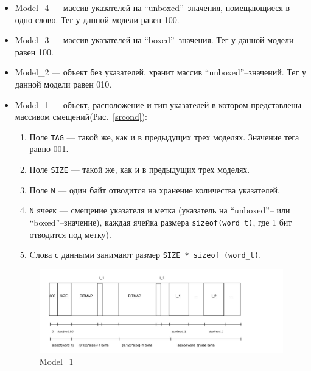\begin{itemize}
\item Model\_4 --- массив указателей на ``unboxed''--значения, помещающиеся в одно слово.
Тег у данной модели равен 100.
\item Model\_3 --- массив указателей на ``boxed''--значения.
Тег у данной модели равен 100.

\item Model\_2 --- объект без указателей, хранит массив ``unboxed''--значений.
Тег у данной модели равен 010.

\item Model\_1 --- объект, расположение и тип указателей в котором представлены массивом смещений(Рис.~\ref{srcond}):
\begin{enumerate}
\item Поле \lstinline{TAG} --- такой же, как и в предыдущих трех моделях. Значение тега равно 001.
\item Поле \lstinline{SIZE} --- такой же, как и в предыдущих трех моделях.
\item Поле \lstinline{N} --- один байт отводится на хранение количества указателей.
\item \lstinline{N} ячеек --- смещение указателя и метка (указатель на ``unboxed''-- или ``boxed''--значение), каждая ячейка размера \lstinline{sizeof(word_t)}, где 1 бит отводится под метку). 
\item Cлова с данными занимают размер \lstinline{SIZE * sizeof (word_t)}.
\end{enumerate}

\begin{figure}[h]
\includegraphics[width=1\textwidth]{Kren/2}
\caption{Model\_1}
\label{second}
\end{figure}


\end{itemize}
